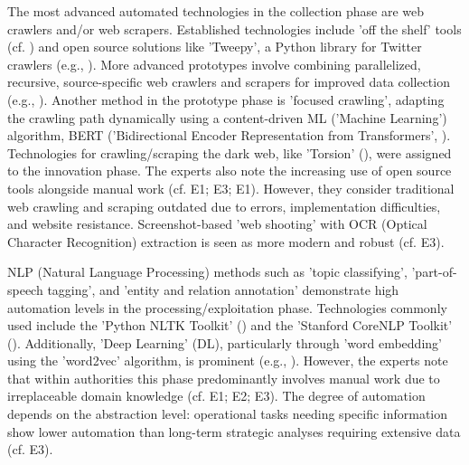 \documentclass[10pt]{article}
\begin{document}
The most advanced automated technologies in the collection phase are web crawlers and/or web scrapers.
Established technologies include 'off the shelf' tools (cf. \cite{Middleton.2020}) and open source
solutions like 'Tweepy', a Python library for Twitter crawlers (e.g., \cite{Adewopo.2020}).
More advanced prototypes involve combining parallelized, recursive, source-specific web crawlers and scrapers for improved
data collection (e.g., \cite{Jenkins.2021}). Another method in the prototype phase is
'focused crawling', adapting the crawling path dynamically using a content-driven ML ('Machine Learning') algorithm, BERT ('Bidirectional Encoder Representation from Transformers', 
\cite{Kuehn.2023}). Technologies for crawling/scraping the dark web, like 'Torsion' (\cite{Sonawane.2022}),
were assigned to the innovation phase. The experts also note the increasing use of open source tools alongside manual work
(cf. E1; E3; E1). However, they consider traditional web crawling and scraping
outdated due to errors, implementation difficulties, and website resistance. Screenshot-based 'web shooting' with
OCR (Optical Character Recognition) extraction is seen as more modern and robust (cf. E3).

NLP (Natural Language Processing) methods such as 'topic classifying', 'part-of-speech tagging', and 'entity and relation annotation'
demonstrate high automation levels in the processing/exploitation phase. Technologies commonly used include
the 'Python NLTK Toolkit' (\cite{Hubbard.2022}) and the 'Stanford CoreNLP Toolkit' (\cite{Middleton.2020}).
Additionally, 'Deep Learning' (DL), particularly through 'word embedding' using the 'word2vec' algorithm, is prominent
(e.g., \cite{Bai.2020}). However, the experts note that within authorities this phase predominantly involves manual work due to irreplaceable domain knowledge
(cf. E1; E2; E3). The degree of automation depends on the abstraction level:
operational tasks needing specific information show lower automation than long-term strategic analyses requiring
extensive data (cf. E3).
\end{document}
